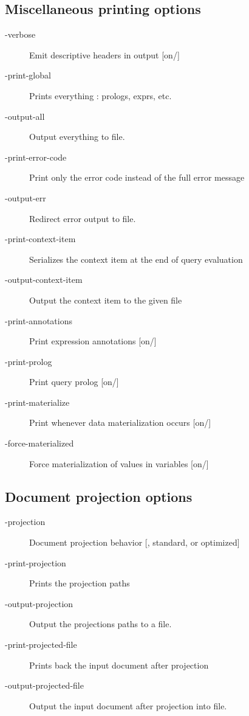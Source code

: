 \subsection{Miscellaneous printing options}
\begin{description}
\item[-verbose]  Emit descriptive headers in output [on/]
\item[-print-global]  Prints everything : prologs, exprs, etc.
\item[-output-all]  Output everything to file.

\item[-print-error-code]  Print only the error code instead of the full error message
\item[-output-err]  Redirect error output to file.

\item[-print-context-item]  Serializes the context item at the end of
  query evaluation
\item[-output-context-item]  Output the context item to the given file

\item[-print-annotations]  Print expression annotations [on/]
\item[-print-prolog]  Print query prolog [on/]

\item[-print-materialize]  Print whenever data materialization occurs [on/]
\item[-force-materialized]  Force materialization of values in
  variables [on/]

\end{description}

\subsection{Document projection options}
\begin{description}
\item[-projection]  Document projection behavior [, standard, or optimized]
\item[-print-projection]  Prints the projection paths
\item[-output-projection]  Output the projections paths to a file.

\item[-print-projected-file]  Prints back the input document after projection
\item[-output-projected-file]  Output the input document after projection into file.

\end{description}

